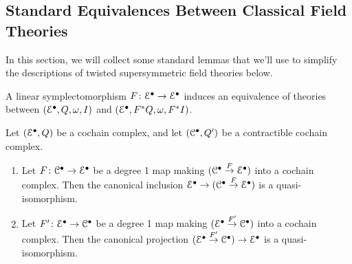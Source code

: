 \documentclass[10pt, oneside]{article}
\begin{document}
\subsection{Standard Equivalences Between Classical Field Theories}
In this section, we will collect some standard lemmas that we'll use to simplify the descriptions of twisted supersymmetric field theories below.

\begin{lemma} \label{symplectomorphism_lemma}
A linear symplectomorphism $F \colon \mathcal{E}^\bullet \to \mathcal{E}^\bullet$ induces an equivalence of theories between $(\mathcal{E}^\bullet, Q, \omega, I)$ and $(\mathcal{E}^\bullet, F^*Q, \omega, F^*I)$.
\end{lemma}

 

\begin{lemma} \label{inclusion_and_projection_lemma}
Let $(\mathcal{E}^\bullet, Q)$ be a cochain complex, and let $(\mathcal{C}^\bullet, Q')$ be a contractible cochain complex.
\begin{enumerate}
 \item Let $F \colon \mathcal{C}^\bullet \to \mathcal{E}^\bullet$ be a degree 1 map making $(\mathcal{C}^\bullet \overset F\to \mathcal{E}^\bullet)$ into a cochain complex.  Then the canonical inclusion $\mathcal{E}^\bullet \to (\mathcal{C}^\bullet \overset F\to \mathcal{E}^\bullet)$ is a quasi-isomorphism.
 \item Let $F' \colon \mathcal{E}^\bullet \to \mathcal{C}^\bullet$ be a degree 1 map making $(\mathcal{E}^\bullet \overset {F'}\to \mathcal{C}^\bullet)$ into a cochain complex.  Then the canonical projection $(\mathcal{E}^\bullet \overset {F'}\to \mathcal{C}^\bullet) \to \mathcal{E}^\bullet$ is a quasi-isomorphism.
\end{enumerate}
\end{lemma}
\end{document}
